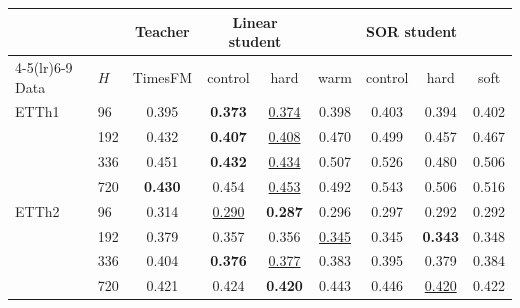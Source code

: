 \begin{tabular}{llccccccc}
\toprule
& & Teacher & \multicolumn{2}{c}{Linear student} & \multicolumn{4}{c}{SOR student} \\
\cmidrule(lr){4-5}\cmidrule(lr){6-9}
Data & $H$ & TimesFM & control & hard & warm & control & hard & soft \\
\midrule
ETTh1 & 96 & 0.395 & \textbf{0.373} & \underline{0.374} & 0.398 & 0.403 & 0.394 & 0.402 \\
 & 192 & 0.432 & \textbf{0.407} & \underline{0.408} & 0.470 & 0.499 & 0.457 & 0.467 \\
 & 336 & 0.451 & \textbf{0.432} & \underline{0.434} & 0.507 & 0.526 & 0.480 & 0.506 \\
 & 720 & \textbf{0.430} & 0.454 & \underline{0.453} & 0.492 & 0.543 & 0.506 & 0.516 \\
\midrule
ETTh2 & 96 & 0.314 & \underline{0.290} & \textbf{0.287} & 0.296 & 0.297 & 0.292 & 0.292 \\
 & 192 & 0.379 & 0.357 & 0.356 & \underline{0.345} & 0.345 & \textbf{0.343} & 0.348 \\
 & 336 & 0.404 & \textbf{0.376} & \underline{0.377} & 0.383 & 0.395 & 0.379 & 0.384 \\
 & 720 & 0.421 & 0.424 & \textbf{0.420} & 0.443 & 0.446 & \underline{0.420} & 0.422 \\
\bottomrule
\end{tabular}